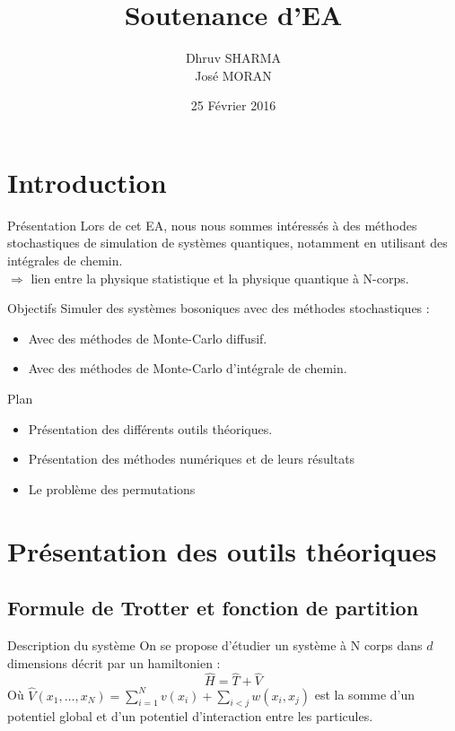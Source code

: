 \documentclass{beamer}
\begin{document}
\title{Soutenance d'EA}
\author{Dhruv SHARMA \\ José MORAN}
\date{25 Février 2016}
\frame{\titlepage}


\section{Introduction}
\begin{frame}{Présentation}
    Lors de cet EA, nous nous sommes intéressés à des méthodes stochastiques de simulation de systèmes quantiques, notamment en utilisant des intégrales de chemin.\pause
    \\    
    $\Rightarrow$ lien entre la physique statistique et la physique quantique à N-corps.
\end{frame}

\begin{frame}{Objectifs}
Simuler des systèmes bosoniques avec des méthodes stochastiques :
    \begin{itemize}
        \item Avec des méthodes de Monte-Carlo diffusif.
        \item Avec des méthodes de Monte-Carlo d'intégrale de chemin.
    \end{itemize}
\end{frame}

\begin{frame}{Plan}
    \begin{itemize}
        \item Présentation des différents outils théoriques.
        \item Présentation des méthodes numériques et de leurs résultats
        \item Le problème des permutations
    \end{itemize}
\end{frame}
\section{Présentation des outils théoriques}
\subsection{Formule de Trotter et fonction de partition}

\begin{frame}{Description du système}
    On se propose d'étudier un système à N corps dans $d$ dimensions décrit par un hamiltonien :
    \begin{equation}
        \hat{H}=\hat{T}+\hat{V}
    \end{equation}
    Où $\hat{V}(x_1,\ldots,x_N)=\sum_{i=1}^N v(x_i)+\sum_{i< j}w(x_i,x_j)$ est la somme d'un potentiel global et d'un potentiel d'interaction entre les particules. 
\end{frame}
\end{document}
